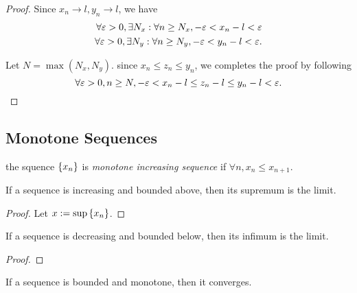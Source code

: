 \begin{proof}
  Since $x_n \to l, y_n \to l$, we have
  \begin{equation}
    \begin{split}
      \forall \varepsilon > 0, \exists N_x: \forall n \ge N_x, -\varepsilon < x_n - l < \varepsilon \\
      \forall \varepsilon > 0, \exists N_y: \forall n \ge N_y, -\varepsilon < y_n - l < \varepsilon.
    \end{split}
  \end{equation}

  Let $N = \max(N_x, N_y)$. since $x_n \le z_n \le y_n$, we completes the proof
  by following
  \begin{equation}
    \forall \varepsilon > 0, n \ge N, -\varepsilon < x_n - l \le z_n - l \le y_n - l < \varepsilon.
  \end{equation}
\end{proof}



\subsection{Monotone Sequences}

\begin{definition}
  \label{def:mono}
  the squence $\{x_n\}$ is \emph{monotone increasing sequence} if $\forall n,
    x_n \le x_{n+1}$.
\end{definition}

\begin{lemma}
  If a sequence is increasing and bounded above, then its supremum is the limit.
  \label{lem:mono_limit_1}
\end{lemma}

\begin{proof}
  Let $x := \sup{\{x_n\}}$.
\end{proof}

\begin{lemma}
  If a sequence is decreasing and bounded below, then its infimum is the limit.
  \label{lem:mono_limit_2}
\end{lemma}

\begin{proof}

\end{proof}

\begin{theorem}
  If a sequence is bounded and monotone, then it converges.
  \label{thm:mono_limit}
\end{theorem}

